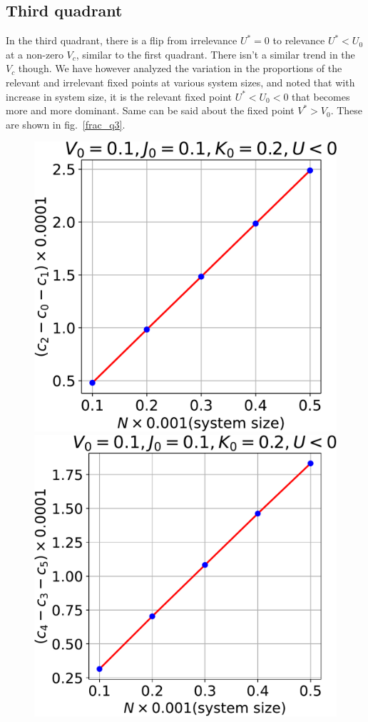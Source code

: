 \documentclass[12pt,twoside]{article}
\numberwithin{equation}{section}
\begin{document}
\subsection{Third quadrant}
In the third quadrant, there is a flip from irrelevance \(U^*=0\) to relevance \(U^*<U_0\) at a non-zero \(V_c\), similar to the first quadrant. There isn't a similar trend in the \(V_c\) though. We have however analyzed the variation in the proportions of the relevant and irrelevant fixed points at various system sizes, and noted that with increase in system size, it is the relevant fixed point \(U^*<U_0<0\) that becomes more and more dominant. Same can be said about the fixed point \(V^*>V_0\). These are shown in fig.~\ref{frac_q3}.
\begin{figure}[htpb!]
\centering
\includegraphics[scale=0.39]{../figures/frac_vs_D_quad3.pdf}
\includegraphics[scale=0.39]{../figures/frac_vs_D_quad33.pdf}

\end{figure}
\end{document}
